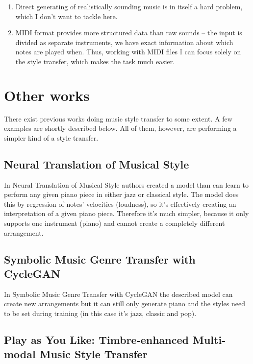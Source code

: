 \documentclass[en]{pracamgr}
\begin{document}
\begin{enumerate}
    \item Direct generating of realistically sounding music is in itself a hard problem, which I don't want to tackle here.
    \item
    MIDI format provides more structured data than raw sounds -- the input is divided as separate instruments, we have exact information about which notes are played when.
    Thus, working with MIDI files I can focus solely on the style transfer, which makes the task much easier.
\end{enumerate}

\chapter{Other works}

There exist previous works doing music style transfer to some extent.
A few examples are shortly described below.
All of them, however, are performing a simpler kind of a style transfer.

\section{Neural Translation of Musical Style}

In Neural Translation of Musical Style \cite{neural_translation} authors created a model than can learn to perform any given piano piece in either jazz or classical style.
The model does this by regression of notes' velocities (loudness), so it's effectively creating an interpretation of a given piano piece.
Therefore it's much simpler, because it only supports one instrument (piano) and cannot create a completely different arrangement.

\section{Symbolic Music Genre Transfer with CycleGAN}

In Symbolic Music Genre Transfer with CycleGAN \cite{cyclegan} the described model can create new arrangements but it can still only generate piano and the styles need to be set during training (in this case it's jazz, classic and pop).

\section{Play as You Like: Timbre-enhanced Multi-modal Music Style Transfer}
\end{document}
